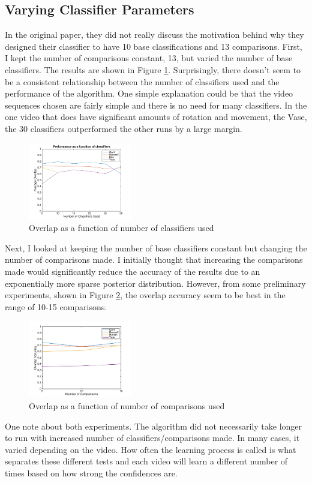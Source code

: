 \documentclass[10pt,twocolumn,letterpaper]{article}
\begin{document}
\subsection{Varying Classifier Parameters}
In the original paper, they did not really discuss the motivation behind why they designed their classifier to have 10 base classifications and 13 comparisons. First, I kept the number of comparisons constant, 13, but varied the number of base classifiers. The results are shown in Figure \ref{fig:classifiers}. Surprisingly, there doesn't seem to be a consistent relationship between the number of classifiers used and the performance of the algorithm. One simple explanation could be that the video sequences chosen are fairly simple and there is no need for many classifiers. In the one video that does have significant amounts of rotation and movement, the Vase, the 30 classifiers outperformed the other runs by a large margin. \\
\begin{figure}
\begin{centering}
\includegraphics[width=0.4\textwidth]{classifiers}
\caption{Overlap as a function of number of classifiers used}
\label{fig:classifiers}
\end{centering}
\end{figure}
Next, I looked at keeping the number of base classifiers constant but changing the number of comparisons made. I initially thought that increasing the comparisons made would significantly reduce the accuracy of the results due to an exponentially more sparse posterior distribution. However, from some preliminary experiments, shown in Figure \ref{fig:comparisons}, the overlap accuracy seem to be best in the range of 10-15 comparisons. \\
\begin{figure}
\begin{centering}
\includegraphics[width=0.4\textwidth]{comparisons}
\caption{Overlap as a function of number of comparisons used}
\label{fig:comparisons}
\end{centering}
\end{figure}
One note about both experiments. The algorithm did not necessarily take longer to run with increased number of classifiers/comparisons made. In many cases, it varied depending on the video. How often the learning process is called is what separates these different tests and each video will learn a different number of times based on how strong the confidences are.  
\end{document}
